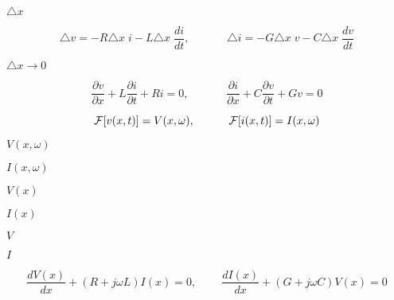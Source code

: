 {\newpage\clearpage
{}%
$\triangle x$%
\lthtmlinlinemathZ
\lthtmlcheckvsize\clearpage}

{\newpage\clearpage
{}%
\begin{displaymath} \triangle v=-R\triangle x\; i-L\triangle x \;\frac{di}{dt},
\;\;\;\;\;\;\;\;\;\;\;\;
\triangle i=-G\triangle x\; v-C\triangle x\; \frac{dv}{dt} \end{displaymath}%
\lthtmldisplayZ
\lthtmlcheckvsize\clearpage}

{\newpage\clearpage
{}%
$\triangle x\rightarrow 0$%
\lthtmlinlinemathZ
\lthtmlcheckvsize\clearpage}

{\newpage\clearpage
{}%
\begin{displaymath}
\frac{\partial v}{\partial x}+L \frac{\partial i}{\partial t}+Ri=0,
\;\;\;\;\;\;\;\;\;\;\;\;
\frac{\partial i}{\partial x}+C \frac{\partial v}{\partial t}+Gv=0
\end{displaymath}%
\lthtmldisplayZ
\lthtmlcheckvsize\clearpage}

{\newpage\clearpage
{}%
\begin{displaymath} {\cal F}[v(x,t)]=V(x,\omega),\;\;\;\;\;\;\;\;\;\;\;{\cal F}[i(x,t)]=I(x,\omega) \end{displaymath}%
\lthtmldisplayZ
\lthtmlcheckvsize\clearpage}

{\newpage\clearpage
{}%
$V(x,\omega)$%
\lthtmlinlinemathZ
\lthtmlcheckvsize\clearpage}

{\newpage\clearpage
{}%
$I(x,\omega)$%
\lthtmlinlinemathZ
\lthtmlcheckvsize\clearpage}

{\newpage\clearpage
{}%
$V(x)$%
\lthtmlinlinemathZ
\lthtmlcheckvsize\clearpage}

{\newpage\clearpage
{}%
$I(x)$%
\lthtmlinlinemathZ
\lthtmlcheckvsize\clearpage}

{\newpage\clearpage
{}%
$V$%
\lthtmlinlinemathZ
\lthtmlcheckvsize\clearpage}

{\newpage\clearpage
{}%
$I$%
\lthtmlinlinemathZ
\lthtmlcheckvsize\clearpage}

{\newpage\clearpage
{}%
\begin{displaymath}
\frac{dV(x)}{dx}+(R+j\omega L)I(x)=0,
\;\;\;\;\;\;\;\;\frac{dI(x)}{dx}+(G+j\omega C)V(x)=0 
\end{displaymath}%
\lthtmldisplayZ
\lthtmlcheckvsize\clearpage}


